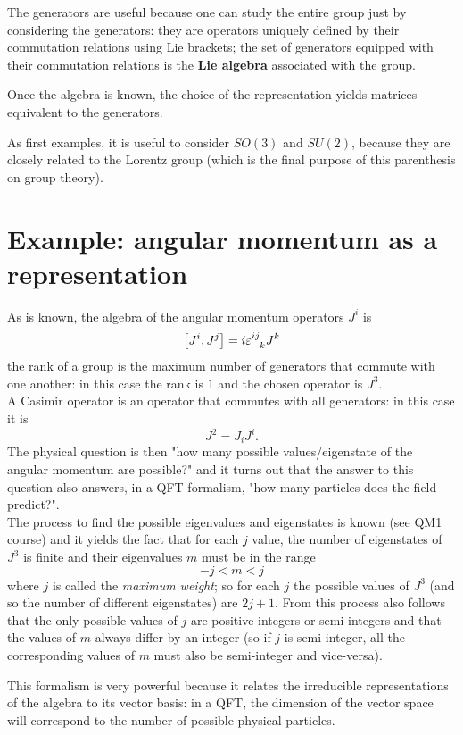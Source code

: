 The generators are useful because one can study the entire group just by considering
the generators: they are operators uniquely defined by their commutation relations
using Lie brackets; the set of generators equipped with their commutation relations
is the \textbf{Lie algebra} associated with the group.

Once the algebra is known, the choice of the representation yields matrices equivalent
to the generators.

As first examples, it is useful to consider $SO(3)$ and $SU(2)$, because they are
closely related to the Lorentz group (which is the final purpose of this parenthesis
on group theory).
\section{Example: angular momentum as a representation}
As is known, the algebra of the angular momentum operators $J^i$ is
\begin{gather*}
    \left[J^i,J^j\right] = i\varepsilon\indices{^i^j_k}J^k
\end{gather*}
the rank of a group is the maximum number of generators that commute with one another:
in this case the rank is $1$ and the chosen operator is $J^3$.\\
A Casimir operator is an operator that commutes with all generators: in this case it
is
$$J^2 = J_iJ^i.$$
The physical question is then "how many possible values/eigenstate of the angular
momentum are possible?" and it turns out that the answer to this question also
answers, in a QFT formalism, "how many particles does the field predict?".\\
The process to find the possible eigenvalues and eigenstates is known (see QM1 course)
and it yields the fact that for each $j$ value, the number of eigenstates of $J^3$
is finite and their eigenvalues $m$ must be in the range
$$-j< m < j$$
where $j$ is called the \textit{maximum weight}; so for each $j$ the possible values
of $J^3$ (and so the number of different eigenstates) are $2j+1$. From this process
also follows that the only possible values of $j$ are positive integers or
semi-integers and that the values of $m$ always differ by an integer (so if $j$ is
semi-integer, all the corresponding values of $m$ must also be semi-integer and
vice-versa).

This formalism is very powerful because it relates the irreducible representations
of the algebra to its vector basis: in a QFT, the dimension of the vector space
will correspond to the number of possible physical particles.

